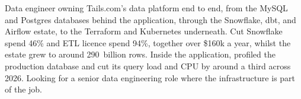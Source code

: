 \documentclass[10pt,a4paper,withhyper,ragged2e]{altacv}
\begin{document}
\makecvheader


Data engineer owning Tails.com's data platform end to end, from the MySQL and Postgres databases
behind the application, through the Snowflake, dbt, and Airflow estate, to the Terraform and
Kubernetes underneath. Cut Snowflake spend 46\% and ETL licence spend 94\%, together over \$160k a
year, whilst the estate grew to around 290~billion rows. Inside the application, profiled the
production database and cut its query load and CPU by around a third across 2026. Looking for a
senior data engineering role where the infrastructure is part of the job.

\end{document}
